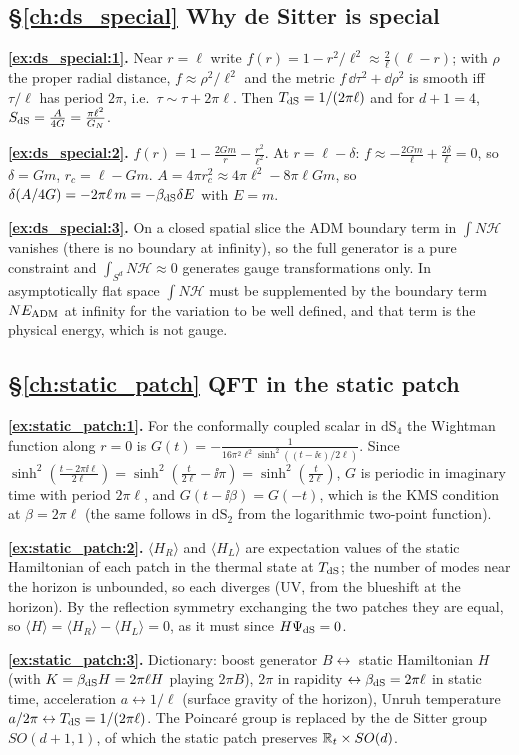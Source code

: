 {\subsection*{\S\ref{ch:ds_special} Why de Sitter is special}
\textbf{\ref{ex:ds_special:1}.} Near $r=\ell$ write $f(r)=1-r^2/\ell^2\approx\frac2\ell(\ell-r)$; with $\rho$ the proper radial distance, $f\approx\rho^2/\ell^2$ and the metric $f\,\dd\tau^2+\dd\rho^2$ is smooth iff $\tau/\ell$ has period $2\pi$, i.e.\ $\tau\sim\tau+2\pi\ell$. Then $T_{\rm dS}=1/(2\pi\ell)$ and for $d+1=4$, $S_{\rm dS}=\frac A{4G}=\frac{\pi\ell^2}{G_N}$.\par
\textbf{\ref{ex:ds_special:2}.} $f(r)=1-\frac{2Gm}r-\frac{r^2}{\ell^2}$. At $r=\ell-\delta$: $f\approx-\frac{2Gm}\ell+\frac{2\delta}\ell=0$, so $\delta=Gm$, $r_c=\ell-Gm$. $A=4\pi r_c^2\approx4\pi\ell^2-8\pi\ell Gm$, so $\delta(A/4G)=-2\pi\ell\,m=-\beta_{\rm dS}\delta E$ with $E=m$.\par
\textbf{\ref{ex:ds_special:3}.} On a closed spatial slice the ADM boundary term in $\int N\mathcal H$ vanishes (there is no boundary at infinity), so the full generator is a pure constraint and $\int_{S^d}N\mathcal H\approx0$ generates gauge transformations only. In asymptotically flat space $\int N\mathcal H$ must be supplemented by the boundary term $N E_{\rm ADM}$ at infinity for the variation to be well defined, and that term is the physical energy, which is not gauge.\par

\subsection*{\S\ref{ch:static_patch} QFT in the static patch}
\textbf{\ref{ex:static_patch:1}.} For the conformally coupled scalar in $\mathrm{dS}_4$ the Wightman function along $r=0$ is $G(t)=-\frac1{16\pi^2\ell^2\sinh^2((t-\ii\epsilon)/2\ell)}$. Since $\sinh^2(\frac{t-2\pi\ii\ell}{2\ell})=\sinh^2(\frac t{2\ell}-\ii\pi)=\sinh^2(\frac t{2\ell})$, $G$ is periodic in imaginary time with period $2\pi\ell$, and $G(t-\ii\beta)=G(-t)$, which is the KMS condition at $\beta=2\pi\ell$ (the same follows in $\mathrm{dS}_2$ from the logarithmic two-point function).\par
\textbf{\ref{ex:static_patch:2}.} $\langle H_R\rangle$ and $\langle H_L\rangle$ are expectation values of the static Hamiltonian of each patch in the thermal state at $T_{\rm dS}$; the number of modes near the horizon is unbounded, so each diverges (UV, from the blueshift at the horizon). By the reflection symmetry exchanging the two patches they are equal, so $\langle H\rangle=\langle H_R\rangle-\langle H_L\rangle=0$, as it must since $H\Psi_{\rm dS}=0$.\par
\textbf{\ref{ex:static_patch:3}.} Dictionary: boost generator $B\leftrightarrow$ static Hamiltonian $H$ (with $K=\beta_{\rm dS}H=2\pi\ell H$ playing $2\pi B$), $2\pi$ in rapidity $\leftrightarrow\beta_{\rm dS}=2\pi\ell$ in static time, acceleration $a\leftrightarrow1/\ell$ (surface gravity of the horizon), Unruh temperature $a/2\pi\leftrightarrow T_{\rm dS}=1/(2\pi\ell)$. The Poincar\'e group is replaced by the de Sitter group $SO(d+1,1)$, of which the static patch preserves $\mathbb{R}_t\times SO(d)$.\par

}
